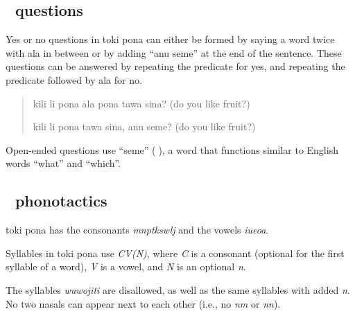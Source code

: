 \documentclass[statementpaper,oneside,article,14pt]{memoir}
\begin{document}
\subsection{{\sitpon󱥙} questions}

\noindent Yes or no questions in toki pona can either be formed by saying a word twice with ala in 
between or by adding ``anu seme'' at the end of the sentence. These questions can be answered 
by repeating the predicate for yes, and repeating the predicate followed by ala for no.

\begin{quote}
  kili li pona ala pona tawa sina? (do you like fruit?)

  kili li pona tawa sina, anu seme? (do you like fruit?)
\end{quote}
Open-ended questions use ``seme'' ({\sitpon󱥙}), a word that functions similar to
English words ``what'' and ``which''.

\subsection{{\sitpon󱤕} phonotactics}

toki pona has the consonants \textit{mnptkswlj} and the vowels \textit{iueoa}.

Syllables in toki pona use \textit{CV(N)}, where \textit{C} is a consonant 
(optional for the first syllable of a word), \textit{V} is a vowel, and \textit{N} is 
an optional \textit{n}.

The syllables \textit{wuwojiti} are disallowed, as well as the same syllables with added 
\textit{n}. No two nasals can appear next to each other (i.e., no \textit{nm} or \textit{nn}).
\end{document}
